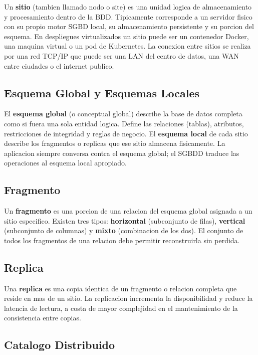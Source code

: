 \documentclass[11pt,a4paper]{article}
\begin{document}
Un \textbf{sitio} (tambien llamado nodo o site) es una unidad logica de almacenamiento y procesamiento dentro de la BDD. Tipicamente corresponde a un servidor fisico con su propio motor SGBD local, su almacenamiento persistente y su porcion del esquema. En despliegues virtualizados un sitio puede ser un contenedor Docker, una maquina virtual o un pod de Kubernetes. La conexion entre sitios se realiza por una red TCP/IP que puede ser una LAN del centro de datos, una WAN entre ciudades o el internet publico.

\subsection{Esquema Global y Esquemas Locales}

El \textbf{esquema global} (o conceptual global) describe la base de datos completa como si fuera una sola entidad logica. Define las relaciones (tablas), atributos, restricciones de integridad y reglas de negocio. El \textbf{esquema local} de cada sitio describe los fragmentos o replicas que ese sitio almacena fisicamente. La aplicacion siempre conversa contra el esquema global; el SGBDD traduce las operaciones al esquema local apropiado.

\subsection{Fragmento}

Un \textbf{fragmento} es una porcion de una relacion del esquema global asignada a un sitio especifico. Existen tres tipos: \textbf{horizontal} (subconjunto de filas), \textbf{vertical} (subconjunto de columnas) y \textbf{mixto} (combinacion de los dos). El conjunto de todos los fragmentos de una relacion debe permitir reconstruirla sin perdida.

\subsection{Replica}

Una \textbf{replica} es una copia identica de un fragmento o relacion completa que reside en mas de un sitio. La replicacion incrementa la disponibilidad y reduce la latencia de lectura, a costa de mayor complejidad en el mantenimiento de la consistencia entre copias.

\subsection{Catalogo Distribuido}
\end{document}
